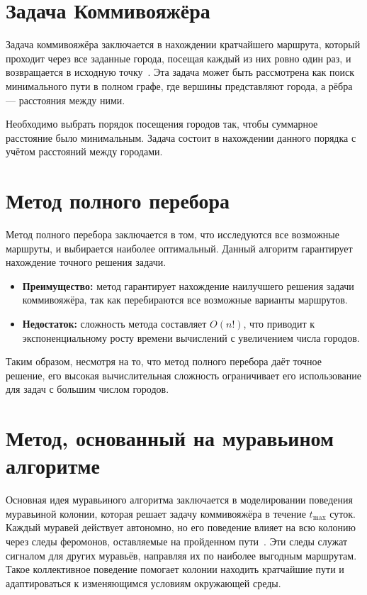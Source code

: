 \newpage


\section{Задача Коммивояжёра}

Задача коммивояжёра заключается в нахождении кратчайшего маршрута, который проходит через все заданные города, посещая каждый из них ровно один раз, и возвращается в исходную точку~\cite{shtovba_ants}. Эта задача может быть рассмотрена как поиск минимального пути в полном графе, где вершины представляют города, а рёбра --- расстояния между ними.

Необходимо выбрать порядок посещения городов так, чтобы суммарное расстояние было минимальным. Задача состоит в нахождении данного порядка с учётом расстояний между городами.

\section{Метод полного перебора}
Метод полного перебора заключается в том, что исследуются все возможные маршруты, и выбирается наиболее оптимальный. Данный алгоритм гарантирует нахождение точного решения задачи.

\begin{itemize}
  \item \textbf{Преимущество:} метод гарантирует нахождение наилучшего решения задачи коммивояжёра, так как перебираются все возможные варианты маршрутов.
  \item \textbf{Недостаток:} сложность метода составляет $O(n!)$, что приводит к экспоненциальному росту времени вычислений с увеличением числа городов.
\end{itemize}

Таким образом, несмотря на то, что метод полного перебора даёт точное решение, его высокая вычислительная сложность ограничивает его использование для задач с большим числом городов.

\section{Метод, основанный на муравьином алгоритме}
Основная идея муравьиного алгоритма заключается в моделировании поведения муравьиной колонии, которая решает задачу коммивояжёра в течение $t_{\text{max}}$ суток. Каждый муравей действует автономно, но его поведение влияет на всю колонию через следы феромонов, оставляемые на пройденном пути~\cite{ulyanov_algorithms}. Эти следы служат сигналом для других муравьёв, направляя их по наиболее выгодным маршрутам. Такое коллективное поведение помогает колонии находить кратчайшие пути и адаптироваться к изменяющимся условиям окружающей среды.

